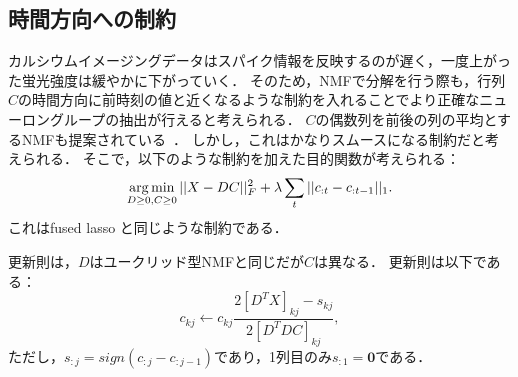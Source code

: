 \subsection{時間方向への制約}
カルシウムイメージングデータはスパイク情報を反映するのが遅く，一度上がった蛍光強度は緩やかに下がっていく．
そのため，NMFで分解を行う際も，行列$C$の時間方向に前時刻の値と近くなるような制約を入れることでより正確なニューロングループの抽出が行えると考えられる．
$C$の偶数列を前後の列の平均とするNMFも提案されている~\cite{Cheung2015}．
しかし，これはかなりスムースになる制約だと考えられる．
そこで，以下のような制約を加えた目的関数が考えられる：
\begin{equation}
	\operatorname*{arg\,min}_{D \geq 0, C \geq 0}||X - DC||^2_F + \lambda \sum_t||c_{:t} - c_{:t-1}||_1.
  \label{eq:NMF-ar}
\end{equation}
これはfused lasso \cite{Tibshirani2005}と同じような制約である．

更新則は，$D$はユークリッド型NMFと同じだが$C$は異なる．
更新則は以下である：
\begin{equation}
	c_{kj} \leftarrow c_{kj} \frac{2[D^T X]_{kj} - s_{kj}}{2[D^T DC]_{kj}},
\end{equation}
ただし，$s_{:j} = sign(c_{:j} - c_{:j-1})$であり，1列目のみ$s_{:1} = \mathbf{0}$である．
